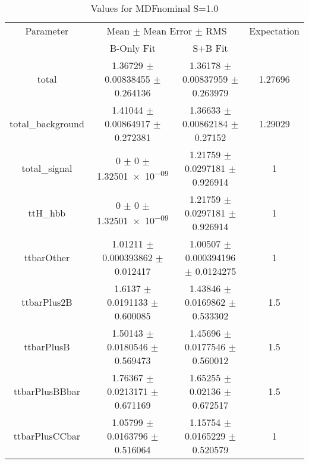\begin{table}
\centering
\caption{Values for MDFnominal S=1.0}
\begin{tabular}{cccc}
\toprule
Parameter & \multicolumn{2}{c}{Mean $\pm$ Mean Error $\pm$ RMS} & Expectation\\
 & B-Only Fit & S+B Fit & \\
\midrule
total & \num{1.36729} $\pm$ \num{0.00838455} $\pm$ \num{0.264136} & \num{1.36178} $\pm$ \num{0.00837959} $\pm$ \num{0.263979} & \num{1.27696}\\
total\_background & \num{1.41044} $\pm$ \num{0.00864917} $\pm$ \num{0.272381} & \num{1.36633} $\pm$ \num{0.00862184} $\pm$ \num{0.27152} & \num{1.29029}\\
total\_signal & \num{0} $\pm$ \num{0} $\pm$ \num{1.32501e-09} & \num{1.21759} $\pm$ \num{0.0297181} $\pm$ \num{0.926914} & \num{1}\\
ttH\_hbb & \num{0} $\pm$ \num{0} $\pm$ \num{1.32501e-09} & \num{1.21759} $\pm$ \num{0.0297181} $\pm$ \num{0.926914} & \num{1}\\
ttbarOther & \num{1.01211} $\pm$ \num{0.000393862} $\pm$ \num{0.012417} & \num{1.00507} $\pm$ \num{0.000394196} $\pm$ \num{0.0124275} & \num{1}\\
ttbarPlus2B & \num{1.6137} $\pm$ \num{0.0191133} $\pm$ \num{0.600085} & \num{1.43846} $\pm$ \num{0.0169862} $\pm$ \num{0.533302} & \num{1.5}\\
ttbarPlusB & \num{1.50143} $\pm$ \num{0.0180546} $\pm$ \num{0.569473} & \num{1.45696} $\pm$ \num{0.0177546} $\pm$ \num{0.560012} & \num{1.5}\\
ttbarPlusBBbar & \num{1.76367} $\pm$ \num{0.0213171} $\pm$ \num{0.671169} & \num{1.65255} $\pm$ \num{0.02136} $\pm$ \num{0.672517} & \num{1.5}\\
ttbarPlusCCbar & \num{1.05799} $\pm$ \num{0.0163796} $\pm$ \num{0.516064} & \num{1.15754} $\pm$ \num{0.0165229} $\pm$ \num{0.520579} & \num{1}\\
\bottomrule
\end{tabular}
\end{table}